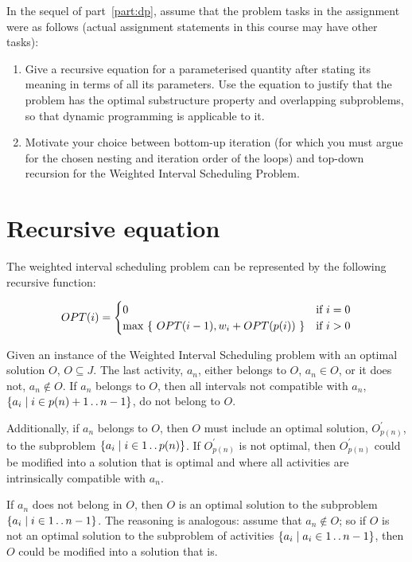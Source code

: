 \documentclass[a4paper,11pt]{article}
\newcommand{\twodots}{\mathinner{\ldotp\ldotp}}  %
\newcommand{\Set}[1]{\left\{#1\right\}}
\newcommand{\SetComp}[2]{\Set{#1\SuchThat#2}}
\newcommand{\SuchThat}{\mid}
\begin{document}
\medskip

In the sequel of part~\ref{part:dp}, assume that the problem tasks in
the assignment were as follows (actual assignment statements in this
course may have other tasks):
\begin{enumerate}
\renewcommand{\theenumi}{\Alph{enumi}}
\item Give a recursive equation for a parameterised quantity after 
  stating its meaning in terms of all its parameters. Use the equation
  to justify that the problem has the optimal substructure property
  and overlapping subproblems, so that dynamic programming is applicable
  to it.
\item Motivate your choice between bottom-up iteration (for which you
  must argue for  the chosen nesting and iteration order of the loops)
  and top-down recursion for the Weighted Interval Scheduling Problem.
\end{enumerate}

\section{Recursive equation}
\label{sec:recursive:actsel}

The weighted interval scheduling problem can be represented by the following
recursive function:

\begin{equation} \label{dp:opt}
  OPT(i) =
  \begin{cases}
    0 & \hfill \text{if } i = 0 \\
    \max~\{~OPT(i - 1), w_i + OPT(p(i))~\} & \hfill \text{if } i > 0
  \end{cases}
\end{equation}

Given an instance of the Weighted Interval Scheduling problem with an optimal
solution $O$, $O \subseteq J$. The last activity, $a_n$, either belongs to
$O$, $a_n \in O$, or it does not, $a_n \notin O$. If $a_n$ belongs to $O$,
then all intervals not compatible with $a_n$,
$\SetComp{a_i}{i \in p(n)+1 \twodots n-1}$, do not belong to $O$.

Additionally, if $a_n$ belongs to $O$, then $O$ must include an optimal
solution, $O^\prime_{p(n)}$, to the subproblem
$\SetComp{a_i}{i \in 1 \twodots p(n)}$. If $O^\prime_{p(n)}$ is not optimal,
then $O^\prime_{p(n)}$ could be modified into a solution that is optimal
and where all activities are intrinsically compatible with $a_n$.

If $a_n$ does not belong in $O$, then $O$ is an optimal solution to the
subproblem $\SetComp{a_i}{i \in 1 \twodots n-1}$. The reasoning is
analogous: assume that $a_n \notin O$; so if $O$ is not an
optimal solution to the subproblem of activities
$\SetComp{a_i}{a_i \in 1 \twodots n-1}$, then $O$ could be modified into
a solution that is.
\end{document}
